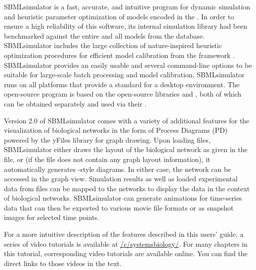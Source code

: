 SBMLsimulator is a fast, accurate, and intuitive program for dynamic simulation and heuristic parameter optimization of models encoded in the \SBML.
In order to ensure a high reliability of this software, its internal simulation library had been
benchmarked against the entire \SBMLTestSuite and all models from the \BioModels database.
SBMLsimulator includes the large collection of nature-inspired heuristic optimization procedures for efficient model calibration from the framework \EvA.
SBMLsimulator provides an easily usable \GUI and several command-line options to be suitable for large-scale batch processing and model calibration.
SBMLsimulator runs on all platforms that provide a standard \JVM for a desktop environment.
The open-source program is based on the open-source libraries \JSBML and \SBSCL, both of which can be obtained separately and used via their \API.

Version 2.0 of SBMLsimulator comes with a variety of additional features for the visualization of biological networks in the form of \SBGN Process Diagrams (PD) powered by the yFiles library for graph drawing.
Upon loading \SBML files, SBMLsimulator either draws the layout of the biological network as given in the file, or (if the \SBML file does not contain any graph layout information), it automatically generates \SBGN-style diagrams.
In either case, the network can be accessed in the graph view.
Simulation results as well as loaded experimental data from \CSV files can be mapped to the networks to display the data in the context of biological networks.
SBMLsimulator can generate animations for time-series data that can then be exported to various movie file formats or as snapshot images for selected time points.

For a more intuitive description of the features described in this users' guide, a series of video tutorials is available at \href{https://youtube.com/c/systemsbiology/}{\faYoutube/c/systemsbiology/}.
For many chapters in this tutorial, corresponding video tutorials are available online.
You can find the direct links to those videos in the text.